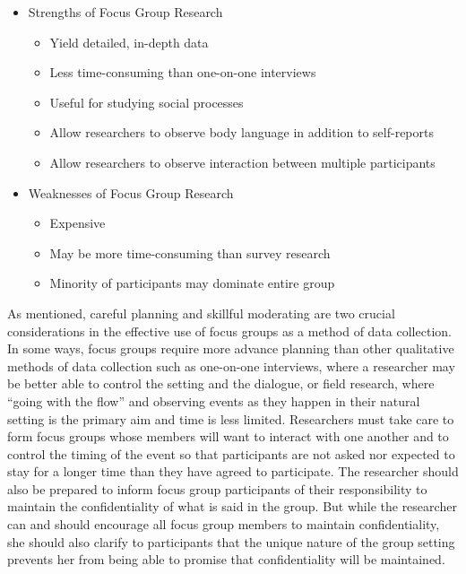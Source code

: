 \begin{itemize}
	\item Strengths of Focus Group Research
	
	\begin{itemize}
		\item Yield detailed, in-depth data
		\item Less time-consuming than one-on-one interviews
		\item Useful for studying social processes
		\item Allow researchers to observe body language in addition to self-reports
		\item Allow researchers to observe interaction between multiple participants
	\end{itemize}
	
	\item Weaknesses of Focus Group Research
	
	\begin{itemize}
		\item Expensive
		\item May be more time-consuming than survey research
		\item Minority of participants may dominate entire group
	\end{itemize}
	
\end{itemize}

As mentioned, careful planning and skillful moderating are two crucial considerations in the effective use of focus groups as a method of data collection. In some ways, focus groups require more advance planning than other qualitative methods of data collection such as one-on-one interviews, where a researcher may be better able to control the setting and the dialogue, or field research, where ``going with the flow'' and observing events as they happen in their natural setting is the primary aim and time is less limited. Researchers must take care to form focus groups whose members will want to interact with one another and to control the timing of the event so that participants are not asked nor expected to stay for a longer time than they have agreed to participate. The researcher should also be prepared to inform focus group participants of their responsibility to maintain the confidentiality of what is said in the group. But while the researcher can and should encourage all focus group members to maintain confidentiality, she should also clarify to participants that the unique nature of the group setting prevents her from being able to promise that confidentiality will be maintained.

